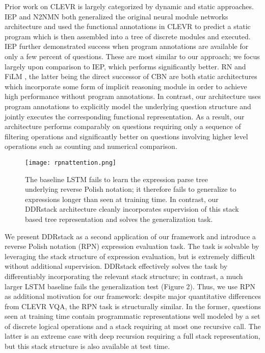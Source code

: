 \documentclass{article}
\begin{document}
Prior work on CLEVR is largely categorized by dynamic and static approaches. IEP and N2NMN both generalized the original neural module networks architecture and used the functional annotations in CLEVR to predict a static program which is then assembled into a tree of discrete modules and executed. IEP further demonstrated success when program annotations are available for only a few percent of questions. These are most similar to our approach; we focus largely upon comparison to IEP, which performs significantly better. RN \cite{DBLP:journals/corr/SantoroRBMPBL17} and FiLM \cite{1709.07871}, the latter being the direct successor of CBN \cite{1707.03017} are both static architectures which incorporate some form of implicit reasoning module in order to achieve high performance without program annotations. In contrast, our architecture uses program annotations to explicitly model the underlying question structure and jointly executes the corresponding functional representation. As a result, our architecture performs comparably on questions requiring only a sequence of filtering operations and significantly better on questions involving higher level operations such as counting and numerical comparison.

\begin{figure}
  \centering
  \texttt{[image: rpnattention.png]}
  \vspace{-3mm}
  \caption{The baseline LSTM fails to learn the expression parse tree underlying reverse Polish notation; it therefore fails to generalize to expressions longer than seen at training time. In contrast, our DDRstack architecture cleanly incorporates supervision of this stack based tree representation and solves the generalization task.}
  \vspace{-5mm}
\end{figure}

We present DDRstack as a second application of our framework and introduce a reverse Polish notation (RPN) expression evaluation task. The task is solvable by leveraging the stack structure of expression evaluation, but is extremely difficult without additional supervision. DDRstack effectively solves the task by differentiably incorporating the relevant stack structure; in contrast, a much larger LSTM baseline fails the generalization test (Figure 2). Thus, we use RPN as additional motivation for our framework: despite major quantitative differences from CLEVR VQA, the RPN task is structurally similar. In the former, questions seen at training time contain programmatic representations well modeled by a set of discrete logical operations and a stack requiring at most one recursive call. The latter is an extreme case with deep recursion requiring a full stack representation, but this stack structure is also available at test time.
\end{document}
